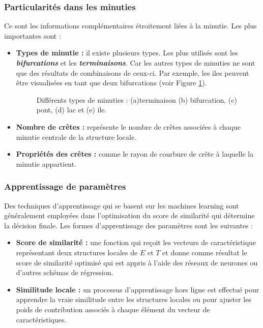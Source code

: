 \subsubsection{Particularités dans les minuties}
Ce sont les informations complémentaires étroitement liées à la minutie. Les plus importantes sont :
\begin{itemize}
	\item \textbf{Types de minutie :} il existe plusieurs types. Les plus utilisés sont les \textit{\textbf{bifurcations}} et les \textit{\textbf{terminaisons}}. Car les autres types de minuties ne sont que des résultats de combinaisons de ceux-ci. Par exemple, les iles peuvent être visualisées en tant que deux bifurcations (voir Figure \ref{fig:chapitre2types}). 
	\begin{center}
		\begin{figure}[H]
			\centering
			\caption{Différents types de minuties : (a)terminaison (b) bifurcation, (c) pont, (d) lac et (e) ile.}
			\label{fig:chapitre2types}
		\end{figure}
	\end{center}
	\item\textbf{Nombre de crêtes :} représente le nombre de crêtes associées à chaque minutie centrale de la structure locale.
	\item \textbf{Propriétés des crêtes :} comme le rayon de courbure de crête à laquelle la minutie appartient.
\end{itemize}
\subsubsection{Apprentissage de paramètres }
Des techniques d'apprentissage qui se basent sur les machines learning sont généralement employées dans l'optimisation du score de similarité qui détermine la décision finale. Les formes d'apprentissage des paramètres sont les suivantes :
\begin{itemize}
	\item \textbf{Score de similarité :} une fonction qui reçoit les vecteurs de caractéristique représentant deux structures locales de $ E $ et $ T $ et donne comme résultat le score de similarité optimisé qui est appris à l'aide des réseaux de neurones ou d'autres schémas de régression.
	\item \textbf{Similitude locale :} un processus d'apprentissage hors ligne est effectué pour apprendre la vraie similitude entre les structures locales ou pour ajuster les poids de contribution associés à chaque élément du vecteur de caractéristiques.	
\end{itemize}

